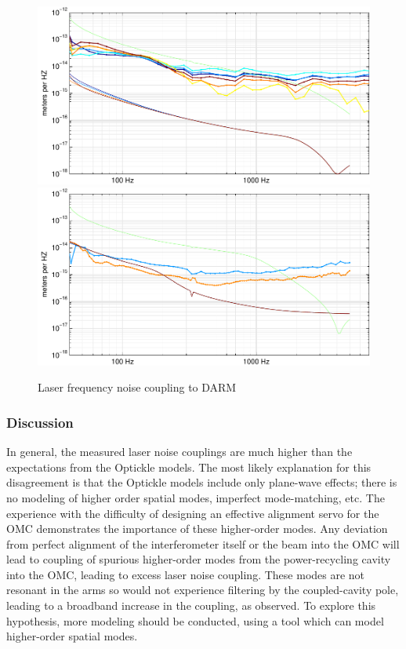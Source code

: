 \begin{figure}
\includegraphics[]{figures/laserFM-L1.pdf}
\includegraphics[]{figures/laserFM-H1.pdf}
\caption[Laser frequency noise coupling (measured and modeled)]{Laser frequency noise coupling to DARM}
\end{figure}

\subsubsection*{Discussion}
In general, the measured laser noise couplings are much higher than
the expectations from the Optickle models.  The most likely
explanation for this disagreement is that the Optickle models include
only plane-wave effects; there is no modeling of higher order spatial
modes, imperfect mode-matching, etc.  The experience with the
difficulty of designing an effective alignment servo for the OMC
demonstrates the importance of these higher-order modes.  Any
deviation from perfect alignment of the interferometer itself or the
beam into the OMC will lead to coupling of spurious higher-order modes
from the power-recycling cavity into the OMC, leading to excess laser
noise coupling.  These modes are not resonant in the arms so would not
experience filtering by the coupled-cavity pole, leading to a
broadband increase in the coupling, as observed.  To explore this
hypothesis, more modeling should be conducted, using a tool which can
model higher-order spatial modes.

